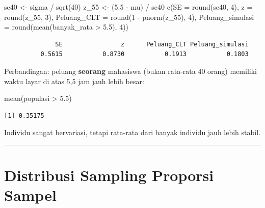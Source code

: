 \documentclass[
  indonesian,
  letterpaper,
]{book}
\newenvironment{Shaded}{\begin{snugshade}}{\end{snugshade}}
\newcommand{\AttributeTok}[1]{\textcolor[rgb]{0.40,0.45,0.13}{#1}}
\newcommand{\DecValTok}[1]{\textcolor[rgb]{0.68,0.00,0.00}{#1}}
\newcommand{\FloatTok}[1]{\textcolor[rgb]{0.68,0.00,0.00}{#1}}
\newcommand{\FunctionTok}[1]{\textcolor[rgb]{0.28,0.35,0.67}{#1}}
\newcommand{\NormalTok}[1]{\textcolor[rgb]{0.00,0.23,0.31}{#1}}
\newcommand{\OtherTok}[1]{\textcolor[rgb]{0.00,0.23,0.31}{#1}}
\newcommand{\SpecialCharTok}[1]{\textcolor[rgb]{0.37,0.37,0.37}{#1}}
\begin{document}
\begin{Shaded}
\begin{Highlighting}[]
\NormalTok{se40 }\OtherTok{\textless{}{-}}\NormalTok{ sigma }\SpecialCharTok{/} \FunctionTok{sqrt}\NormalTok{(}\DecValTok{40}\NormalTok{)}
\NormalTok{z\_55 }\OtherTok{\textless{}{-}}\NormalTok{ (}\FloatTok{5.5} \SpecialCharTok{{-}}\NormalTok{ mu) }\SpecialCharTok{/}\NormalTok{ se40}
\FunctionTok{c}\NormalTok{(}\AttributeTok{SE =} \FunctionTok{round}\NormalTok{(se40, }\DecValTok{4}\NormalTok{), }\AttributeTok{z =} \FunctionTok{round}\NormalTok{(z\_55, }\DecValTok{3}\NormalTok{),}
  \AttributeTok{Peluang\_CLT =} \FunctionTok{round}\NormalTok{(}\DecValTok{1} \SpecialCharTok{{-}} \FunctionTok{pnorm}\NormalTok{(z\_55), }\DecValTok{4}\NormalTok{),}
  \AttributeTok{Peluang\_simulasi =} \FunctionTok{round}\NormalTok{(}\FunctionTok{mean}\NormalTok{(banyak\_rata }\SpecialCharTok{\textgreater{}} \FloatTok{5.5}\NormalTok{), }\DecValTok{4}\NormalTok{))}
\end{Highlighting}
\end{Shaded}

\begin{verbatim}
              SE                z      Peluang_CLT Peluang_simulasi 
          0.5615           0.8730           0.1913           0.1803 
\end{verbatim}

Perbandingan: peluang \textbf{seorang} mahasiswa (bukan rata-rata 40
orang) memiliki waktu layar di atas 5,5 jam jauh lebih besar:

\begin{Shaded}
\begin{Highlighting}[]
\FunctionTok{mean}\NormalTok{(populasi }\SpecialCharTok{\textgreater{}} \FloatTok{5.5}\NormalTok{)}
\end{Highlighting}
\end{Shaded}

\begin{verbatim}
[1] 0.35175
\end{verbatim}

Individu sangat bervariasi, tetapi rata-rata dari banyak individu jauh
lebih stabil.

\begin{center}\rule{0.5\linewidth}{0.5pt}\end{center}


\chapter{Distribusi Sampling Proporsi
Sampel}\label{distribusi-sampling-proporsi-sampel}
\end{document}
